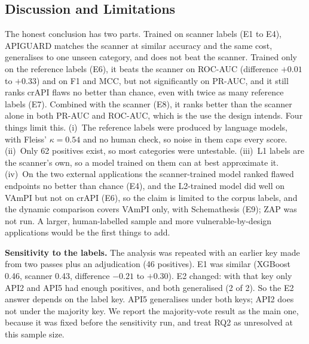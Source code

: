 \documentclass[conference]{IEEEtran}
\begin{document}
\subsection{Discussion and Limitations}
The honest conclusion has two parts. Trained on scanner labels (E1 to E4), APIGUARD matches the scanner at similar accuracy and the same cost, generalises to one
unseen category, and does not beat the scanner. Trained only on the reference labels (E6), it beats the scanner on ROC-AUC (difference $+0.01$ to $+0.33$) and on F1 and MCC, but not
significantly on PR-AUC, and it still ranks crAPI flaws no better than chance, even with twice as many reference labels (E7). Combined with the scanner (E8), it ranks better than the scanner alone in both PR-AUC and ROC-AUC, which is the use the design intends. Four things limit this. (i)~The reference labels were produced by
language models, with Fleiss' $\kappa=0.54$ and no human check, so noise in them caps every score. (ii)~Only 62 positives exist,
so most categories were untestable. (iii)~L1 labels are the scanner's own, so a model trained on them can at best
approximate it. (iv)~On the two external applications the scanner-trained model ranked flawed endpoints no better than chance (E4), and the L2-trained model did well on VAmPI but not on crAPI (E6), so the claim is limited to the corpus labels, and the dynamic comparison covers VAmPI only, with Schemathesis (E9); ZAP was not run. A larger, human-labelled sample and more vulnerable-by-design applications would be the first things to add.

\textbf{Sensitivity to the labels.} The analysis was repeated with an earlier key made from two passes
plus an adjudication (46 positives). E1 was similar (XGBoost 0.46, scanner 0.43, difference $-0.21$ to $+0.30$).
E2 changed: with that key only API2 and API5 had enough positives, and both generalised (2 of 2).
So the E2 answer depends on the label key. API5 generalises under both keys; API2 does not under the majority key.
We report the majority-vote result as the main one, because it was fixed before the sensitivity run, and
treat RQ2 as unresolved at this sample size.

\end{document}
